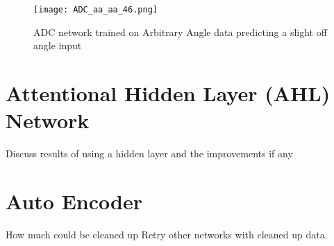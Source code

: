 \begin{figure}[h]
    \centering
    \texttt{[image: ADC\_aa\_aa\_46.png]}
    \caption{ADC network trained on Arbitrary Angle data predicting a slight off angle input}
    \label{fig:ADC_aaaa_fork}
\end{figure}




\section{Attentional Hidden Layer (AHL) Network}

Discuss results of using a hidden layer and the improvements if any


\section{Auto Encoder}
How much could be cleaned up
Retry other networks with cleaned up data.

